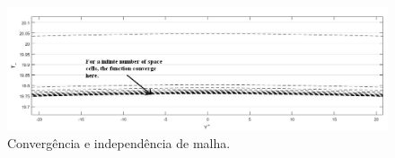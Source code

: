 \documentclass[xcolor=dvipsnames,10pt,aspectratio=169]{beamer}
\begin{document}
	
	
	
	
			\begin{frame}
		\begin{figure}
			\centering
			\includegraphics[angle=0, scale=0.42]{convergnciaprimeira}
			\caption{Convergência e independência de malha.}
			\label{convergencia}
		\end{figure}
	\end{frame}
		
	
	
	
		
\end{document}
